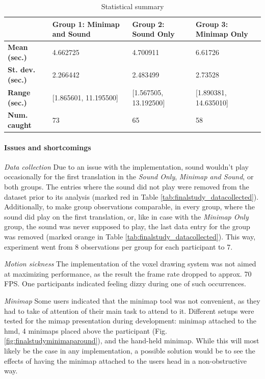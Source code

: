\begin{table}[h]
	\caption{Statistical summary}
	\label{tab:final_study_stats}
	
	\begin{tabularx}{\linewidth}{|X|X|X|X|}
		\hline
		& \textbf{Group 1: Minimap and Sound} & \textbf{Group 2: Sound Only} & \textbf{Group 3: Minimap Only} \\ \hline
		\textbf{Mean (sec.)}  & 4.662725                            & 4.700911                     & 6.61726                        \\ \hline
		\textbf{St. dev. (sec.)}  & 2.266442                            & 2.483499                     & 2.73528                        \\ \hline
		\textbf{Range (sec.)} & {[}1.865601, 11.195500{]}           & {[}1.567505, 13.192500{]}    & {[}1.890381, 14.635010{]}      \\ \hline
		\textbf{Num. caught}  & 73                                  & 65                           & 58                             \\ \hline
	\end{tabularx}
\end{table}

\paragraph{Issues and shortcomings} \hfill

\textit{Data collection} Due to an issue with the implementation, sound wouldn't play occasionally for the first translation in the \textit{Sound Only}, \textit{Minimap and Sound}, or both groups. The entries where the sound did not play were removed from the dataset prior to its analysis (marked red in Table \ref{tab:finalstudy_datacollected}). Additionally, to make group observations comparable, in every group, where the sound did play on the first translation, or, like in case with the \textit{Minimap Only} group, the sound was never supposed to play, the last data entry for the group was removed (marked orange in Table \ref{tab:finalstudy_datacollected}). This way, experiment went from 8 observations per group for each participant to 7.

\textit{Motion sickness} The implementation of the voxel drawing system was not aimed at maximizing performance, as the result the frame rate dropped to approx. 70 FPS. One participants indicated feeling dizzy during one of such occurrences.

\textit{Minimap} Some users indicated that the minimap tool was not convenient, as they had to take of attention of their main task to attend to it. Different setups were tested for the mimap presentation during development: minimap attached to the \gls{hmd}, 4 minimaps placed above the participant (Fig. \ref{fig:finalstudyminimaparound}), and the hand-held minimap. While this will most likely be the case in any implementation, a possible solution would be to see the effects of having the minimap attached to the users head in a non-obstructive way.


